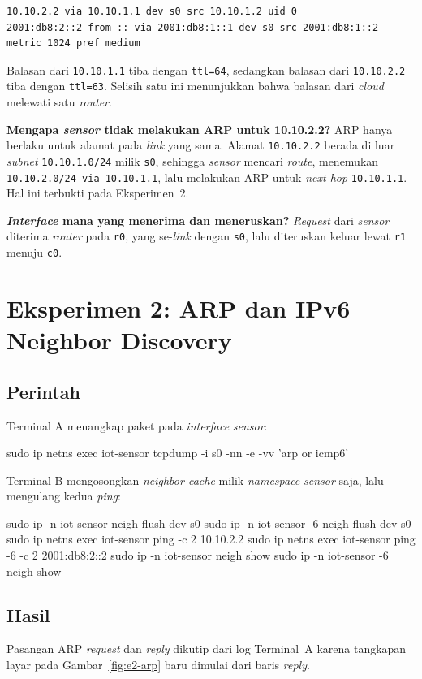 \documentclass[12pt,a4paper]{report}
\newcommand{\kode}[1]{\texttt{\small #1}}
\begin{document}
\begin{lstlisting}[style=keluaran]
10.10.2.2 via 10.10.1.1 dev s0 src 10.10.1.2 uid 0
2001:db8:2::2 from :: via 2001:db8:1::1 dev s0 src 2001:db8:1::2 metric 1024 pref medium
\end{lstlisting}

Balasan dari \kode{10.10.1.1} tiba dengan \kode{ttl=64}, sedangkan balasan dari \kode{10.10.2.2} tiba dengan \kode{ttl=63}. Selisih satu ini menunjukkan bahwa balasan dari \emph{cloud} melewati satu \emph{router}.

\textbf{Mengapa \emph{sensor} tidak melakukan ARP untuk 10.10.2.2?} ARP hanya berlaku untuk alamat pada \emph{link} yang sama. Alamat \kode{10.10.2.2} berada di luar \emph{subnet} \kode{10.10.1.0/24} milik \kode{s0}, sehingga \emph{sensor} mencari \emph{route}, menemukan \kode{10.10.2.0/24 via 10.10.1.1}, lalu melakukan ARP untuk \emph{next hop} \kode{10.10.1.1}. Hal ini terbukti pada Eksperimen~2.

\textbf{\emph{Interface} mana yang menerima dan meneruskan?} \emph{Request} dari \emph{sensor} diterima \emph{router} pada \kode{r0}, yang se-\emph{link} dengan \kode{s0}, lalu diteruskan keluar lewat \kode{r1} menuju \kode{c0}.

\section{Eksperimen 2: ARP dan IPv6 Neighbor Discovery}

\subsection{Perintah}
Terminal A menangkap paket pada \emph{interface} \emph{sensor}:
\begin{cmd}
sudo ip netns exec iot-sensor tcpdump -i s0 -nn -e -vv 'arp or icmp6'
\end{cmd}

Terminal B mengosongkan \emph{neighbor cache} milik \emph{namespace} \emph{sensor} saja, lalu mengulang kedua \emph{ping}:
\begin{cmd}
sudo ip -n iot-sensor neigh flush dev s0
sudo ip -n iot-sensor -6 neigh flush dev s0
sudo ip netns exec iot-sensor ping -c 2 10.10.2.2
sudo ip netns exec iot-sensor ping -6 -c 2 2001:db8:2::2
sudo ip -n iot-sensor neigh show
sudo ip -n iot-sensor -6 neigh show
\end{cmd}

\subsection{Hasil}
Pasangan ARP \emph{request} dan \emph{reply} dikutip dari log Terminal~A karena tangkapan layar pada Gambar~\ref{fig:e2-arp} baru dimulai dari baris \emph{reply}.
\end{document}
